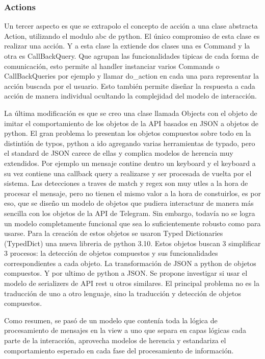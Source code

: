 \subsubsection{Actions}
Un tercer aspecto es que se extrapolo el concepto de acción a una clase abstracta Action, utilizando el modulo abc de python. El único compromiso de esta clase es realizar una acción. Y a esta clase la extiende dos clases una es Command y la otra es CallBackQuery. Que agrupan las funcionalidades tipicas de cada forma de comunicación, esto permite al handler instanciar varios Commands o CallBackQueries por ejemplo y llamar do_action en cada una para representar la acción buscada por el usuario.
Esto también permite diseñar la respuesta a cada acción de manera individual ocultando la complejidad del modelo de interacción.


La última modificación es que se creo una clase llamada Objects con el objeto de imitar el comportamiento de los objetos de la API basados en JSON a objetos de python. El gran problema lo presentan los objetos compuestos sobre todo en la distintión de typos, python a ido agregando varias herramientas de typado, pero el standard de JSON carece de ellas y complica modelos de herencia muy extendidos. Por ejemplo un mensaje contine dentro un keyboard y el keyboard a su vez contiene una callback query a realizarse y ser procesada de vuelta por el sistema. Las detecciones a traves de match y regex son muy utles a la hora de procesar el mensaje, pero no tienen el mismo valor a la hora de constuirlos, es por eso, que se diseño un modelo de objetos que pudiera interactuar de manera más sencilla con los objetos de la API de Telegram. Sin embargo, todavía no se logra un modelo completamente funcional que sea lo suficientemente robusto como para usarse. Para la creación de estos objetos se usaron Typed Dictionaries (TypedDict) una nueva libreria de python 3.10.
Estos objetos buscan 3 simplificar 3 procesos: la detección de objetos compuestos y sus funcionalidades correspondientes a cada objeto. La transformación de JSON a python de objetos compuestos. Y por ultimo de python a JSON.
Se propone investigar si usar el modelo de serializers de API rest u otros similares. El principal problema no es la traducción de uno a otro lenguaje, sino la traducción y detección de objetos compuestos.

Como resumen, se pasó de un modelo que contenía toda la lógica de procesamiento de mensajes en la view a uno que separa en capas lógicas cada parte de la interacción, aprovecha modelos de herencia y estandariza el comportamiento esperado en cada fase del procesamiento de información.

